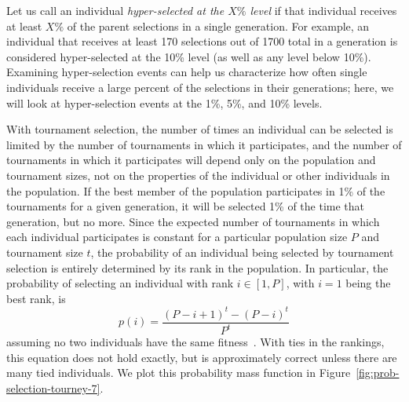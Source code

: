 \documentclass{sig-alternate}
\newcommand{\definition}[1]{\textit{#1}}
\begin{document}
Let us call an individual \definition{hyper-selected at the $X\%$ level} if that individual receives at least $X\%$ of the parent selections in a single generation. For example, an individual that receives at least 170 selections out of 1700 total in a generation is considered hyper-selected at the 10\% level (as well as any level below 10\%). Examining hyper-selection events can help us characterize how often single individuals receive a large percent of the selections in their generations; here, we will %
look at hyper-selection events at the 1\%, 5\%, and 10\% levels.

With tournament selection, the number of times an individual can be selected is limited by the number of tournaments in which it participates, and the number of tournaments in which it participates will depend only on the population and tournament sizes, not on the properties of the individual or other individuals in the population. If the best member of the population participates in 1\% of the tournaments for a given generation, it will be selected 1\% of the time that generation, but no more.
 Since the expected number of tournaments in which each individual participates is constant for a particular population size $P$ and tournament size $t$, the probability of an individual being selected by tournament selection is entirely determined by its rank in the population. In particular, the probability of selecting an individual with rank $i \in [1,P]$, with $i = 1$ being the best rank, is
\begin{equation}\label{tourneyProbEquation}
p(i) = \frac{(P-i+1)^t - (P-i)^t}{P^t}
\end{equation}
assuming no two individuals have the same fitness~\cite{350042, Blickle:1995:MAT:645514.658088}. With ties in the rankings, this equation does not hold exactly, but is approximately correct unless there are many tied individuals. We plot this probability mass function in Figure~\ref{fig:prob-selection-tourney-7}.
\end{document}
